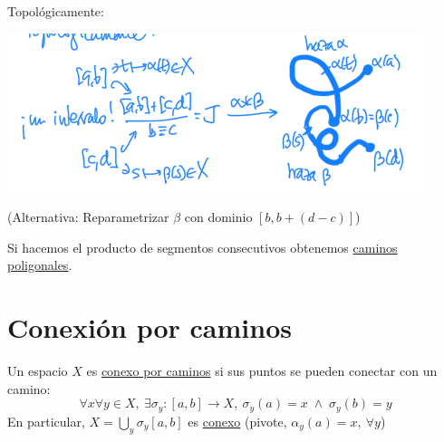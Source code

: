 \begin{prop}
Topológicamente: 
\begin{center}
    \includegraphics[scale=0.3]{images/prod_caminos} 
\end{center}
(Alternativa: Reparametrizar $\beta$ con dominio $\left[ b, b + \left( d - c \right) \right]$)
\end{prop}

\begin{ej}
Si hacemos el producto de segmentos consecutivos obtenemos \underline{caminos poligonales}. 
\end{ej}

\section{Conexión por caminos}%
\label{sec:conexion_por_caminos}
\begin{defi}
Un espacio $X$ es \underline{conexo por caminos} si sus puntos se pueden conectar con un camino:
\[
\forall x \forall y \in X,\ \exists \sigma_y: \left[ a, b \right] \rightarrow X,\ \sigma_y\left( a \right) = x\; \land \;\sigma_y\left( b \right) = y
\]
En particular, $X = \bigcup_{y} \sigma_y\left[ a, b \right]$ es \underline{conexo} (pivote, $\alpha_y\left( a \right) = x,\ \forall y$)
\end{defi}

